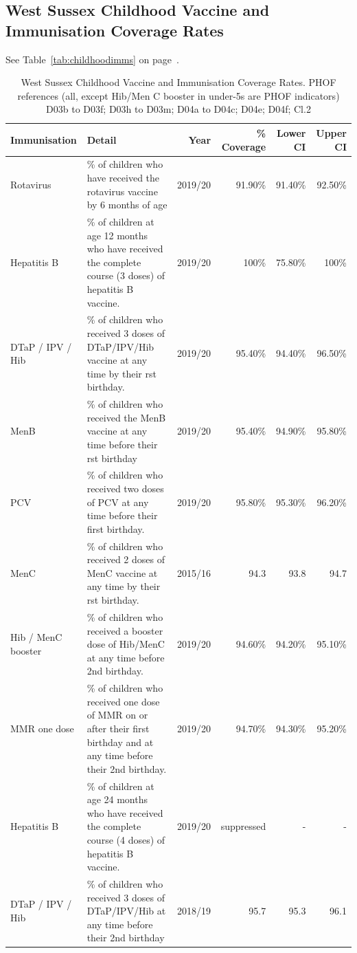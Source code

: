 \subsection{West Sussex Childhood Vaccine and Immunisation Coverage Rates}
See Table~\ref{tab:childhoodimms} on page~\pageref{tab:childhoodimms}.
\begin{table}[hbt]
    \scriptsize
    \caption{West Sussex Childhood Vaccine and Immunisation Coverage Rates. PHOF references (all, except Hib/Men C booster in under-5s are PHOF indicators) D03b to D03f; D03h to D03m; D04a to D04c; D04e; D04f; Cl.2}
    \centering
    \begin{tabular}{llrrrr}
    \toprule
    Immunisation &  Detail & Year & \% Coverage & Lower CI & Upper CI \\
    \midrule
    Rotavirus & \% of children who have received the rotavirus vaccine by 6 months of age & 2019/20	& 91.90\% & 91.40\% & 92.50\% \\
    Hepatitis B & \% of children at age 12 months who have received the complete course (3 doses) of hepatitis B vaccine. & 2019/20	& 100\% & 75.80\% & 100\% \\
    DTaP / IPV / Hib & \% of children who received 3 doses of DTaP/IPV/Hib vaccine at any time by their rst birthday. & 2019/20	& 95.40\% & 94.40\% & 96.50\% \\
    MenB & \% of children who received the MenB vaccine at any time before their rst birthday & 2019/20	& 95.40\% & 94.90\% & 95.80\% \\
    PCV & \% of children who received two doses of PCV at any time before their first birthday. & 2019/20 & 95.80\% & 95.30\% & 96.20\% \\
    MenC & \% of children who received 2 doses of MenC vaccine at any time by their rst birthday. & 2015/16 & 94.3 & 93.8 & 94.7 \\
    Hib / MenC booster & \% of children who received a booster dose of Hib/MenC at any time before 2nd birthday. & 2019/20 & 94.60\% & 94.20\% & 95.10\% \\
    MMR one dose & \% of children who received one dose of MMR on or after their first birthday and at any time before their 2nd birthday. & 2019/20 & 94.70\% & 94.30\% & 95.20\% \\
    Hepatitis B & \% of children at age 24 months who have received the complete course (4 doses) of hepatitis B vaccine. & 2019/20 & suppressed & - & - \\
    DTaP / IPV / Hib & \% of children who received 3 doses of DTaP/IPV/Hib at any time before their 2nd birthday & 2018/19 & 95.7 & 95.3 & 96.1 \\

\end{tabular}
\end{table}
